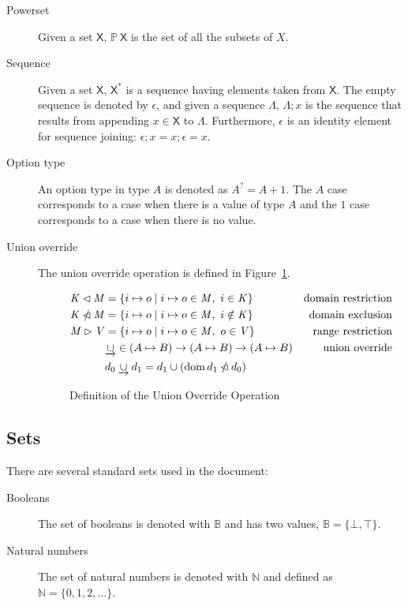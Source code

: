 \documentclass[11pt,a4paper]{article}
\DeclareMathOperator{\dom}{dom}
\newcommand{\powerset}[1]{\mathbb{P}~#1}
\newcommand{\restrictdom}{\lhd}
\newcommand{\subtractdom}{\mathbin{\slashed{\restrictdom}}}
\newcommand{\restrictrange}{\rhd}
\newcommand{\unionoverride}{\mathbin{\underrightarrow\cup}}
\newcommand{\var}[1]{\mathit{#1}}
\newcommand{\type}[1]{\mathsf{#1}}
\newcommand{\seqof}[1]{#1^{*}}
\begin{document}
\begin{description}
\item[Powerset] Given a set $\type{X}$, $\powerset{\type{X}}$ is the set of all
  the subsets of $X$.
\item[Sequence] Given a set $\type{X}$, $\seqof{\type{X}}$ is a sequence
  having elements taken from $\type{X}$.
  The empty sequence is denoted by $\epsilon$, and given a sequence $\Lambda$,
  $\Lambda; x$ is the sequence that results from appending
  $x \in \type{X}$ to $\Lambda$.
  Furthermore, $\epsilon$ is an identity element for sequence joining:
  $\epsilon; x = x; \epsilon = x$.
\item[Option type] An option type in type $A$ is denoted as $A^? = A + 1$. The
  $A$ case corresponds to a case when there is a value of type $A$ and the $1$
  case corresponds to a case when there is no value.
\item[Union override] The union override operation is defined in
  Figure~\ref{fig:unionoverride}.
  \begin{figure}
    \begin{align*}
      \var{K} \restrictdom \var{M}
      & = \{ i \mapsto o \mid i \mapsto o \in \var{M}, ~ i \in \var{K} \}
      & \text{domain restriction}
      \\
      \var{K} \subtractdom \var{M}
      & = \{ i \mapsto o \mid i \mapsto o \in \var{M}, ~ i \notin \var{K} \}
      & \text{domain exclusion}
      \\
      \var{M} \restrictrange \var{V}
      & = \{ i \mapsto o \mid i \mapsto o \in \var{M}, ~ o \in \var{V} \}
      & \text{range restriction}
      \\
      & \unionoverride \in (A \mapsto B) \to (A \mapsto B) \to (A \mapsto B)
      & \text{union override}\\
      & d_0 \unionoverride d_1 = d_1 \cup (\dom d_1 \subtractdom d_0)
    \end{align*}
    \caption{Definition of the Union Override Operation}
    \label{fig:unionoverride}
  \end{figure}
\end{description}

\subsection{Sets}
\label{sec:sets}

There are several standard sets used in the document:
%
\begin{description}
\item[Booleans] The set of booleans is denoted with $\mathbb{B}$ and has two
  values, $\mathbb{B} = \{\bot, \top\}$.
\item[Natural numbers] The set of natural numbers is denoted with
  $\mathbb{N}$ and defined as $\mathbb{N} = \{0, 1, 2, \dots\}$.
\end{description}
\end{document}
